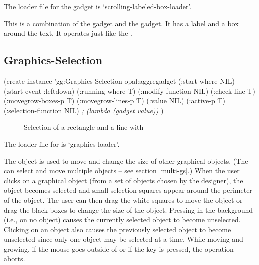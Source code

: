\begin{center}
\end{center}

The loader file for the  gadget is
`scrolling-labeled-box-loader'.

This is a combination of the  gadget and the
 gadget.  It has a label and a box around the text.  It
operates just like the .


\begin{group}
\section{Graphics-Selection}
\label{graphics-selection}

\begin{programexample}
(create-instance 'gg:Graphics-Selection opal:aggregadget
   (:start-where NIL)
   (:start-event :leftdown)
   (:running-where T)
   (:modify-function NIL)
   (:check-line T)
   (:movegrow-boxes-p T)
   (:movegrow-lines-p T)
   (:value NIL)
   (:active-p T)
   (:selection-function NIL)   {\it ; (lambda (gadget value))}
   )
\end{programexample}
\end{group}

\begin{figure}
\begin{center}
\end{center}
\caption{Selection of a rectangle and a line with
}
\end{figure}

\vspace{1 line}

The loader file for  is `graphics-loader'.

The  object is used to move and change the size of other
graphical objects.  (The  can select and
move multiple objects -- see section \ref{multi-gs}.)  When the user
clicks on a graphical object (from a
set of objects chosen by the designer), the object becomes selected
and small selection squares appear around the perimeter of the object.
The user can then drag the white squares to move the object or drag
the black boxes to change the size of the object.  Pressing in the
background (i.e., on no object) causes the currently selected object
to become unselected.  Clicking on an object also causes the
previously selected object to become unselected since only one object
may be selected at a time.  While moving and growing, if the mouse
goes outside of  or if the  key is pressed,
the operation aborts.

